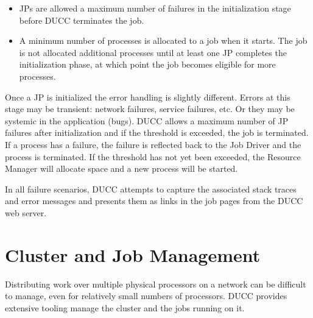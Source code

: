     \begin{itemize}
        \item JPs are allowed a maximum number of failures in the initialization stage before DUCC
          terminates the job.
 
        \item A minimum number of processes is allocated to a job when it starts. The job is not
          allocated additional processes until at least one JP completes the initialization phase,
          at which point the job becomes eligible for more processes.
    \end{itemize}
    
    Once a JP is initialized the error handling is slightly different. Errors at this stage may be
    transient: network failures, service failures, etc. Or they may be systemic in the application
    (bugs). DUCC allows a maximum number of JP failures after initialization and if the threshold is
    exceeded, the job is terminated. If a process has a failure, the failure is reflected back to
    the Job Driver  and the process is terminated. If the threshold has not yet been exceeded, the Resource
    Manager will allocate space and a new process will be started.

    In all failure scenarios, DUCC attempts to capture the associated stack traces and error
    messages and presents them as links in the job pages from the DUCC web server.

    \section{Cluster and Job Management}
    Distributing work over multiple physical processors on a network can be difficult to manage,
    even for relatively small numbers of processors. DUCC provides extensive tooling manage the
    cluster and the jobs running on it.

